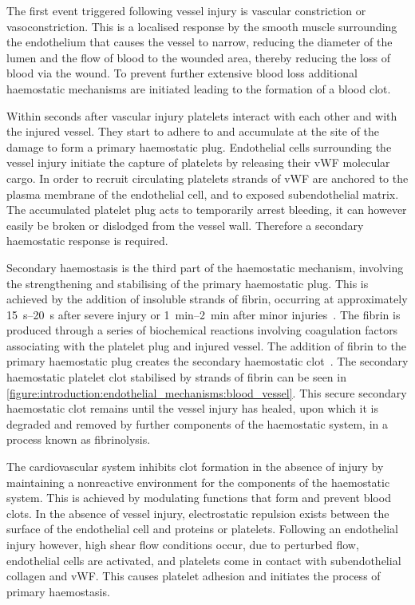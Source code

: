 The first event triggered following vessel injury is vascular constriction or vasoconstriction. This is a localised response by the smooth muscle surrounding the endothelium that causes the vessel to narrow, reducing the diameter of the lumen and the flow of blood to the wounded area, thereby reducing the loss of blood via the wound. To prevent further extensive blood loss additional haemostatic mechanisms are initiated leading to the formation of a blood clot.

Within seconds after vascular injury platelets interact with each other and with the injured vessel. They start to adhere to and accumulate at the site of the damage to form a primary haemostatic plug. Endothelial cells surrounding the vessel injury initiate the capture of platelets by releasing their vWF molecular cargo. In order to recruit circulating platelets strands of vWF are anchored to the plasma membrane of the endothelial cell, and to exposed subendothelial matrix. The accumulated platelet plug acts to temporarily arrest bleeding, it can however easily be broken or dislodged from the vessel wall. Therefore a secondary haemostatic response is required.

Secondary haemostasis is the third part of the haemostatic mechanism, involving the strengthening and stabilising of the primary haemostatic plug. This is achieved by the addition of insoluble strands of fibrin, occurring at approximately \SIrange{15}{20}{\second} after severe injury or \SIrange{1}{2}{\minute} after minor injuries~\cite{Hall2011}. The fibrin is produced through a series of biochemical reactions involving coagulation factors associating with the platelet plug and injured vessel. The addition of fibrin to the primary haemostatic plug creates the secondary haemostatic clot~\cite{Pocock2013}. The secondary haemostatic platelet clot stabilised by strands of fibrin can be seen in \autoref{figure:introduction:endothelial_mechanisms:blood_vessel}. This secure secondary haemostatic clot remains until the vessel injury has healed, upon which it is degraded and removed by further components of the haemostatic system, in a process known as fibrinolysis.

The cardiovascular system inhibits clot formation in the absence of injury by maintaining a nonreactive environment for the components of the haemostatic system. This is achieved by modulating functions that form and prevent blood clots. In the absence of vessel injury, electrostatic repulsion exists between the surface of the endothelial cell and proteins or platelets. Following an endothelial injury however, high shear flow conditions occur, due to perturbed flow, endothelial cells are activated, and platelets come in contact with subendothelial collagen and vWF. This causes platelet adhesion and initiates the process of primary haemostasis.

